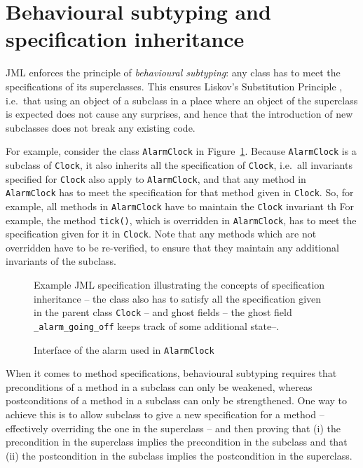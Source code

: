 \documentclass{llncs}
\begin{document}
\section{Behavioural subtyping and specification inheritance}
\label{Sec:behsubtyping}

JML enforces the principle of \emph{behavioural subtyping}: any class
has to meet the specifications of its superclasses.
This ensures Liskov's Substitution Principle \cite{LiskovWing94},
i.e.\ that using an object of a subclass in a place where an object of 
the superclass is expected does not cause any surprises, and hence that 
the introduction of new subclasses does not break any existing code.

For example, consider the class \texttt{AlarmClock} in Figure~\ref{Example:alarmclock}.
Because \texttt{AlarmClock} is a subclass of \texttt{Clock}, it also
inherits all the specification of \texttt{Clock}, i.e.\ 
all invariants specified for \texttt{Clock} also apply to \texttt{AlarmClock},
and that any method in \texttt{AlarmClock} has to meet the specification
for that method given in  \texttt{Clock}.
So, for example, all methods in \texttt{AlarmClock} have to maintain the
\texttt{Clock} invariant th
For example, the method \texttt{tick()}, which is overridden in \texttt{AlarmClock},
has to meet the specification given for it in \texttt{Clock}. 
Note that any methods which are not overridden have to be re-verified, to ensure 
that they maintain any additional invariants of the subclass.

\begin{figure}[tbp] \label{Example:alarmclock}
%

%
\vspace*{-2ex} %
\caption{Example JML specification illustrating the concepts of 
specification inheritance -- the class also has to satisfy all
the specification given in the parent class \texttt{Clock} -- and 
ghost fields -- the ghost field \texttt{\_alarm\_going\_off}
keeps track of some additional state--.}
\end{figure}

\begin{figure}[tbp] \label{Example:alarminterface}
%

%
\vspace*{-2ex} %
\caption{Interface of the alarm used in \texttt{AlarmClock}}
\end{figure}

When it comes to method specifications, behavioural subtyping requires
that preconditions of a method in a subclass can only  be weakened,
whereas postconditions of a method in a subclass can only  be strengthened.
One way to achieve this is to allow subclass to give a new specification
for a method -- effectively overriding the one in the superclass --
and then proving that (i) the precondition in the superclass implies the
precondition in the subclass and that (ii) the postcondition in the subclass
implies the postcondition in the superclass.
\end{document}
